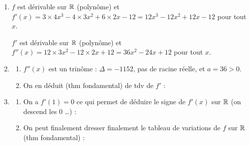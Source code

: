 \documentclass[a4paper,11pt]{article}
\begin{document}
\begin{enumerate}
	\item $f$ est dérivable sur $\R$ (polynôme) et $f'(x)=3 \times 4x^3-4 \times 3x^2+6 \times 2x - 12=12x^3-12x^2+12x-12$ pour tout $x$.
	
	$f'$ est dérivable sur $\R$ (polynôme) et $f''(x)=12 \times 3x^2-12 \times 2x + 12=36x^2-24x+12$ pour tout $x$.
	\item
	\begin{enumerate}
		\item $f''(x)$ est un trinôme : $\Delta = \num{-1152}$, pas de racine réelle, et $a=36>0$.
		\begin{center}
		\end{center}
		\item On en déduit (thm fondamental) de tdv de $f'$ :
		\begin{center}
		\end{center}
	\end{enumerate}
	\item 
	\begin{enumerate}
		\item On a $f'(1)=0$ ce qui permet de déduire le signe de $f'(x)$ sur $\R$ (\og on descend les $0$ \fg\ldots) :
		\begin{center}
		\end{center}
		\item On peut finalement dresser finalement le tableau de variations de $f$ sur $\R$ (thm fondamental) :
		\begin{center}
		\end{center}
	\end{enumerate}
\end{enumerate}
\end{document}
